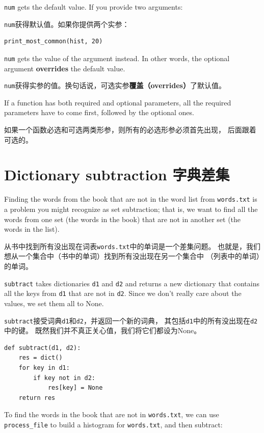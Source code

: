 \documentclass[10pt]{book}
\begin{document}
\begin{CJK}{UTF8}{gbsn}
{\tt num} gets the default value.  If you provide two arguments:

{\tt num}获得默认值。如果你提供两个实参：

\begin{verbatim}
print_most_common(hist, 20)
\end{verbatim}

{\tt num} gets the value of the argument instead.  In other
words, the optional argument {\bf overrides} the default value.

{\tt num}获得实参的值。换句话说，可选实参{\bf 覆盖（overrides）}了默认值。

If a function has both required and optional parameters, all
the required parameters have to come first, followed by the
optional ones.

如果一个函数必选和可选两类形参，则所有的必选形参必须首先出现，
后面跟着可选的。

\section{Dictionary subtraction 字典差集}

Finding the words from the book that are not in the word list
from {\tt words.txt} is a problem you might recognize as set
subtraction; that is, we want to find all the words from one
set (the words in the book) that are not in another set (the
words in the list).

从书中找到所有没出现在词表{\tt words.txt}中的单词是一个差集问题。
也就是，我们想从一个集合中（书中的单词）找到所有没出现在另一个集合中
（列表中的单词）的单词。

{\tt subtract} takes dictionaries {\tt d1} and {\tt d2} and returns a
new dictionary that contains all the keys from {\tt d1} that are not
in {\tt d2}.  Since we don't really care about the values, we
set them all to None.

{\tt subtract}接受词典{\tt d1}和{\tt d2}，并返回一个新的词典，
其包括{\tt d1}中的所有没出现在{\tt d2}中的键。
既然我们并不真正关心值，我们将它们都设为None。

\begin{verbatim}
def subtract(d1, d2):
    res = dict()
    for key in d1:
        if key not in d2:
            res[key] = None
    return res
\end{verbatim}
%
To find the words in the book that are not in {\tt words.txt},
we can use \verb"process_file" to build a histogram for
{\tt words.txt}, and then subtract:


\end{CJK}
\end{document}
